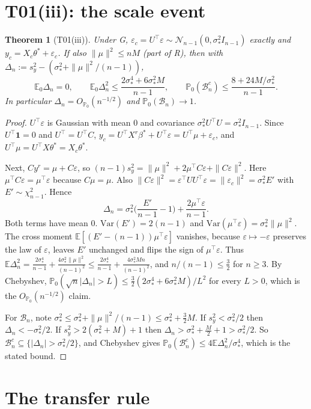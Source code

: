 \documentclass[11pt]{article}
\newtheorem{theorem}{Theorem}[section]
\theoremstyle{remark}
\newcommand{\E}{\mathbb E}
\newcommand{\Prob}{\mathbb P}
\newcommand{\N}{\mathcal N}
\newcommand{\tr}{^{\top}}
\newcommand{\B}{\mathcal B}
\newcommand{\sy}{s_y}
\newcommand{\yc}{y_c}
\newcommand{\Xc}{X_c}
\newcommand{\eps}{\varepsilon}
\begin{document}
\section{T01(iii): the scale event}\label{sec:T01iii}

\begin{theorem}[T01(iii)]\label{thm:T01iii}
Under G, $\eps_c=U\tr\eps\sim\N_{n-1}(0,\sigma_*^2I_{n-1})$ exactly and $\yc=\Xc\theta^*+\eps_c$. If also $\|\mu\|^2\le nM$ (part of R), then with $\Delta_n:=\sy^2-(\sigma_*^2+\|\mu\|^2/(n-1))$,
\[
\E_0\Delta_n=0,\qquad \E_0\Delta_n^2\le\frac{2\sigma_*^4+6\sigma_*^2M}{n-1},\qquad \Prob_0(\B_n^c)\le\frac{8+24M/\sigma_*^2}{n-1}.
\]
In particular $\Delta_n=O_{\Prob_0}(n^{-1/2})$ and $\Prob_0(\B_n)\to1$.
\end{theorem}
\begin{proof}
$U\tr\eps$ is Gaussian with mean $0$ and covariance $\sigma_*^2U\tr U=\sigma_*^2I_{n-1}$. Since $U\tr\mathbf 1=0$ and $U\tr=U\tr C$, $\yc=U\tr X^r\beta^*+U\tr\eps=U\tr\mu+\eps_c$, and $U\tr\mu=U\tr X\theta^*=\Xc\theta^*$.

Next, $Cy^r=\mu+C\eps$, so $(n-1)\sy^2=\|\mu\|^2+2\mu\tr C\eps+\|C\eps\|^2$. Here $\mu\tr C\eps=\mu\tr\eps$ because $C\mu=\mu$. Also $\|C\eps\|^2=\eps\tr UU\tr\eps=\|\eps_c\|^2=\sigma_*^2E'$ with $E'\sim\chi^2_{n-1}$. Hence
\[
\Delta_n=\sigma_*^2\Big(\frac{E'}{n-1}-1\Big)+\frac{2\mu\tr\eps}{n-1}.
\]
Both terms have mean $0$. $\mathrm{Var}(E')=2(n-1)$ and $\mathrm{Var}(\mu\tr\eps)=\sigma_*^2\|\mu\|^2$. The cross moment $\E[(E'-(n-1))\mu\tr\eps]$ vanishes, because $\eps\mapsto-\eps$ preserves the law of $\eps$, leaves $E'$ unchanged and flips the sign of $\mu\tr\eps$. Thus $\E\Delta_n^2=\frac{2\sigma_*^4}{n-1}+\frac{4\sigma_*^2\|\mu\|^2}{(n-1)^2}\le\frac{2\sigma_*^4}{n-1}+\frac{4\sigma_*^2Mn}{(n-1)^2}$, and $n/(n-1)\le\frac32$ for $n\ge3$. By Chebyshev, $\Prob_0(\sqrt n|\Delta_n|>L)\le\frac32(2\sigma_*^4+6\sigma_*^2M)/L^2$ for every $L>0$, which is the $O_{\Prob_0}(n^{-1/2})$ claim.

For $\B_n$, note $\sigma_*^2\le\sigma_*^2+\|\mu\|^2/(n-1)\le\sigma_*^2+\frac32M$. If $\sy^2<\sigma_*^2/2$ then $\Delta_n<-\sigma_*^2/2$. If $\sy^2>2(\sigma_*^2+M)+1$ then $\Delta_n>\sigma_*^2+\frac M2+1>\sigma_*^2/2$. So $\B_n^c\subseteq\{|\Delta_n|>\sigma_*^2/2\}$, and Chebyshev gives $\Prob_0(\B_n^c)\le4\E\Delta_n^2/\sigma_*^4$, which is the stated bound.
\end{proof}

\section{The transfer rule}\label{sec:transfer}
\end{document}

